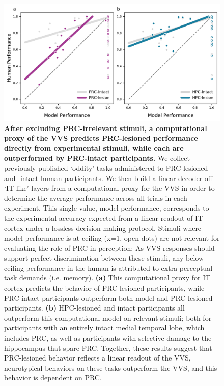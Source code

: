 \documentclass[11pt]{article}
\begin{document}
\begin{figure}[ht]
\centering
\includegraphics[width=\linewidth]{figures/F2}
\caption{\textbf{After excluding PRC-irrelevant stimuli, a computational proxy of the VVS predicts PRC-lesioned performance directly from experimental stimuli, while each are outperformed by PRC-intact participants.} We collect previously published `oddity' tasks administered to PRC-lesioned and -intact human participants. We then build a linear decoder off `IT-like' layers from a computational proxy for the VVS in order to determine the average performance across all trials in each experiment. This single value, model performance, corresponds to the experimental accuracy expected from a linear readout of IT cortex under a lossless decision-making protocol. Stimuli where model performance is at ceiling (x=1, open dots) are not relevant for evaluating the role of PRC in perception: As VVS responses should support perfect discrimination between these stimuli, any below ceiling performance in the human is attributed to extra-perceptual task demands (i.e. memory). \textbf{(a)} This computational proxy for IT cortex predicts the behavior of PRC-lesioned participants, while PRC-intact participants outperform both model and PRC-lesioned participants. \textbf{(b)} HPC-lesioned and intact participants all outperform this computational model on relevant stimuli; both for participants with an entirely intact medial temporal lobe, which includes PRC, as well as participants with selective damage to the hippocampus that spare PRC. Together, these results suggest that PRC-lesioned behavior reflects a linear readout of the VVS, neurotypical behaviors on these tasks outperform the VVS, and this behavior is dependent on PRC.}
\label{fig:prc_main}
\end{figure}
\end{document}

